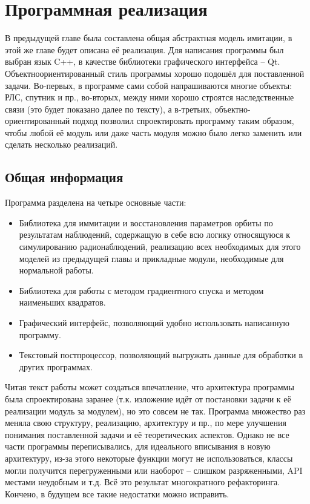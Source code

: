 \chapter{Программная реализация} \label{ch:programm}
В предыдущей главе была составлена общая абстрактная модель имитации, в этой же главе будет описана её реализация.
Для написания программы был выбран язык C++, в качестве библиотеки графического интерфейса -- Qt.
Объектноориентированный стиль программы хорошо подошёл для поставленной задачи. 
Во-первых, в программе сами собой напрашиваются многие объекты: РЛС, спутник и пр., во-вторых, между ними хорошо
строятся наследственные связи (это будет показано далее по тексту), а в-третьих, объектно-ориентированный подход
позволил спроектировать программу таким образом, чтобы любой её модуль или даже часть модуля
можно было легко заменить или сделать несколько реализаций.

\section{Общая информация}

Программа разделена на четыре основные части:
\begin{itemize}
	\item Библиотека для иммитации и восстановления параметров орбиты по результатам наблюдений, содержащую в
			себе всю логику относящуюся к симулированию радионаблюдений, реализацию всех необходимых для этого
			моделей из предыдущей главы и прикладные модули, необходимые для
			нормальной работы.
	\item Библиотека для работы с методом градиентного спуска и методом наименьших квадратов.
	\item Графический интерфейс, позволяющий удобно использовать написанную программу.
	\item Текстовый постпроцессор, позволяющий выгружать данные для обработки в других программах.
\end{itemize}

Читая текст работы может создаться впечатление, что архитектура программы была спроектирована заранее (т.к.
изложение идёт от постановки задачи к её реализации модуль за модулем), но это совсем не так. Программа множество
раз меняла свою структуру, реализацию, архитектуру и пр., по мере улучшения понимания поставленной задачи и её
теоретических аспектов. Однако не все части программы переписывались, для идеального вписывания в новую архитектуру,
из-за этого некоторые функции могут не использоваться, классы могли получится перегруженными или наоборот --
слишком разряженными, API местами неудобным и т.д. Всё это результат многократного рефакторинга. 
Кончено, в будущем все такие недостатки можно исправить.
\newpage

